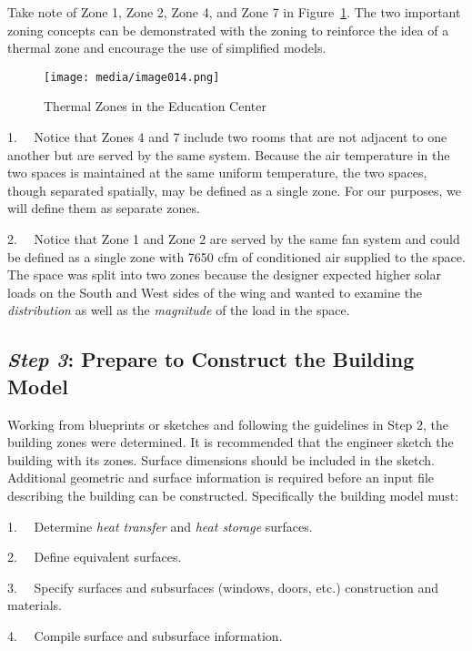 Take note of Zone 1, Zone 2, Zone 4, and Zone 7 in Figure~\ref{fig:thermal-zones-in-the-education-center}. The two important zoning concepts can be demonstrated with the zoning to reinforce the idea of a thermal zone and encourage the use of simplified models.

\begin{figure}[hbtp] %
\centering
\texttt{[image: media/image014.png]}
\caption{Thermal Zones in the Education Center \protect \label{fig:thermal-zones-in-the-education-center}}
\end{figure}

1.~~ Notice that Zones 4 and 7 include two rooms that are not adjacent to one another but are served by the same system. Because the air temperature in the two spaces is maintained at the same uniform temperature, the two spaces, though separated spatially, may be defined as a single zone. For our purposes, we will define them as separate zones.

2.~~ Notice that Zone 1 and Zone 2 are served by the same fan system and could be defined as a single zone with 7650 cfm of conditioned air supplied to the space. The space was split into two zones because the designer expected higher solar loads on the South and West sides of the wing and wanted to examine the \emph{distribution} as well as the \emph{magnitude} of the load in the space.

\subsection{\emph{Step 3}: Prepare to Construct the Building Model}\label{step-3-prepare-to-construct-the-building-model}

Working from blueprints or sketches and following the guidelines in Step 2, the building zones were determined. It is recommended that the engineer sketch the building with its zones. Surface dimensions should be included in the sketch. Additional geometric and surface information is required before an input file describing the building can be constructed. Specifically the building model must:

1.~~ Determine \emph{heat transfer} and \emph{heat storage} surfaces.

2.~~ Define equivalent surfaces.

3.~~ Specify surfaces and subsurfaces (windows, doors, etc.) construction and materials.

4.~~ Compile surface and subsurface information.

